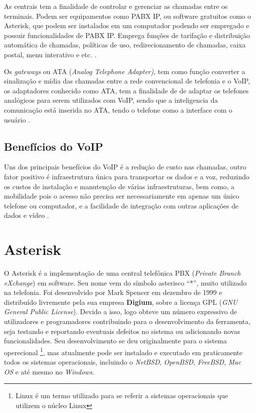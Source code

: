 As centrais tem a finalidade de controlar e gerenciar as chamadas entre os terminais. Podem ser equipamentos como PABX IP, ou software gratuitos como o Asterisk, que podem ser instalados em um computador podendo ser empregado e possuir funcionalidades de PABX IP. Emprega funções de tarifação e distribuição automática de chamadas, políticas de uso, redirecionamento de chamadas, caixa postal, menu interativo e etc. \cite{alexandrekeller2014}.

Os \textit{gateways} ou ATA (\textit{Analog Telephone Adapter)}, tem como função converter a sinalização e mídia das chamadas entre a rede convencional de telefonia e o VoIP, os adaptadores conhecido como ATA, tem a finalidade de de adaptar os telefones analógicos para serem utilizados com VoIP, sendo que a inteligencia da comunicação está inserida no ATA, tendo o telefone como a interface com o usuário \cite{eduardomaronasmonks2006}.


\subsection{Benefícios do VoIP}
Uns dos principais benefícios do VoIP é a redução de custo nas chamadas, outro fator positivo é infraestrutura única para transportar os dados e a voz, reduzindo os custos de instalação e manutenção de várias infraestruturas, bem como, a mobilidade pois o acesso não precisa ser necessariamente em apenas
um único telefone ou computador, e a facilidade de integração com outras aplicações de dados e vídeo \cite{djaneelmajoanine2007}.

\section{Asterisk}
O Asterisk é a implementação de uma central telefônica PBX (\textit{Private Branch eXchange}) em software. Seu nome vem do símbolo asterisco ``*'', muito utilizado na telefonia. Foi desenvolvido por Mark Spencer em dezembro de 1999 e distribuído livremente pela sua empresa \textbf{Digium}, sobre a licença GPL (\textit{GNU General Public License}). Devido a isso, logo obteve um número expressivo de utilizadores e programadores contribuindo para o desenvolvimento da ferramenta, seja testando e reportando eventuais defeitos no sistema ou adicionando novas funcionalidades. Seu desenvolvimento se deu originalmente para o sistema operecional \footnote{Linux é um termo utilizado para se referir a sistemas operacionais que utilizem o núcleo Linux}, mas atualmente pode ser instalado e executado em praticamente todos os sistemas operacionais, incluindo o \textit{NetBSD}, \textit{OpenBSD}, \textit{FreeBSD}, \textit{Mac OS} e até mesmo no \textit{Windows}. \cite{alexandrekeller2014}

